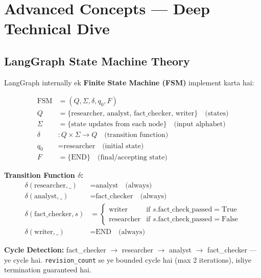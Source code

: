 \documentclass[12pt, a4paper]{article}
\begin{document}
\newpage
\section{Advanced Concepts --- Deep Technical Dive}

\subsection{LangGraph State Machine Theory}

\begin{conceptbox}[title={\faIcon{brain} ~State Machine as Directed Graph}]
LangGraph internally ek \textbf{Finite State Machine (FSM)} implement karta hai:

\begin{align}
\text{FSM} &= (Q, \Sigma, \delta, q_0, F) \\
Q &= \{\text{researcher, analyst, fact\_checker, writer}\} \quad \text{(states)} \\
\Sigma &= \{\text{state updates from each node}\} \quad \text{(input alphabet)} \\
\delta &: Q \times \Sigma \rightarrow Q \quad \text{(transition function)} \\
q_0 &= \text{researcher} \quad \text{(initial state)} \\
F &= \{\text{END}\} \quad \text{(final/accepting state)}
\end{align}

\textbf{Transition Function $\delta$:}
\begin{align}
\delta(\text{researcher}, \_) &= \text{analyst} \quad \text{(always)} \\
\delta(\text{analyst}, \_) &= \text{fact\_checker} \quad \text{(always)} \\
\delta(\text{fact\_checker}, s) &= \begin{cases} \text{writer} & \text{if } s.\text{fact\_check\_passed} = \text{True} \\ \text{researcher} & \text{if } s.\text{fact\_check\_passed} = \text{False} \end{cases} \\
\delta(\text{writer}, \_) &= \text{END} \quad \text{(always)}
\end{align}

\textbf{Cycle Detection:} fact\_checker $\rightarrow$ researcher $\rightarrow$ analyst $\rightarrow$ fact\_checker --- ye cycle hai. \texttt{revision\_count} se ye bounded cycle hai (max 2 iterations), isliye termination guaranteed hai.
\end{conceptbox}
\end{document}

